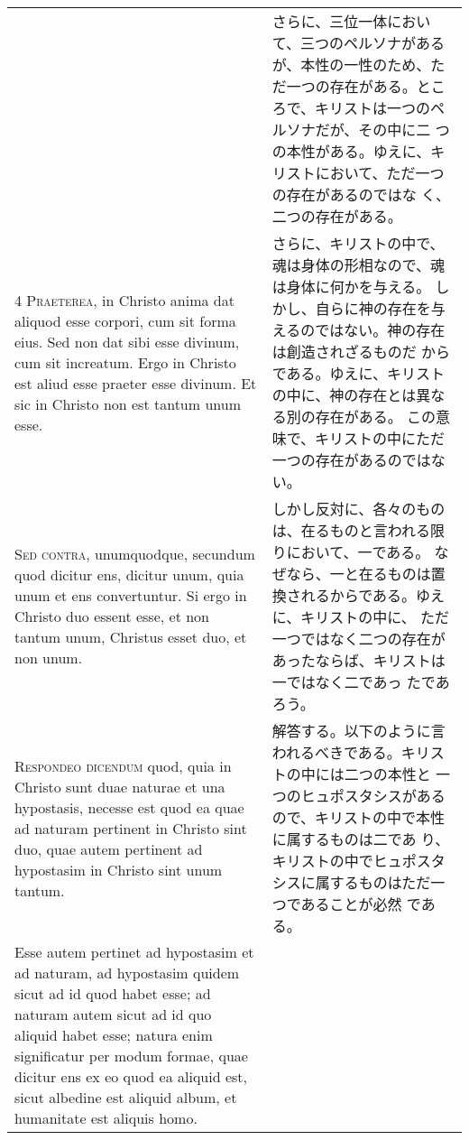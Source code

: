 \documentclass[10pt]{jsarticle} %
\begin{document}
\begin{longtable}{p{21em}p{21em}}
&

さらに、三位一体において、三つのペルソナがあるが、本性の一性のため、た
だ一つの存在がある。ところで、キリストは一つのペルソナだが、その中に二
つの本性がある。ゆえに、キリストにおいて、ただ一つの存在があるのではな
く、二つの存在がある。


\\



{\scshape 4 Praeterea}, in Christo anima dat aliquod esse corpori, cum
sit forma eius. Sed non dat sibi esse divinum, cum sit increatum. Ergo
in Christo est aliud esse praeter esse divinum. Et sic in Christo non
est tantum unum esse.


&

さらに、キリストの中で、魂は身体の形相なので、魂は身体に何かを与える。
しかし、自らに神の存在を与えるのではない。神の存在は創造されざるものだ
からである。ゆえに、キリストの中に、神の存在とは異なる別の存在がある。
この意味で、キリストの中にただ一つの存在があるのではない。


\\



{\scshape Sed contra}, unumquodque, secundum quod dicitur ens, dicitur
unum, quia unum et ens convertuntur. Si ergo in Christo duo essent
esse, et non tantum unum, Christus esset duo, et non unum.


&

しかし反対に、各々のものは、在るものと言われる限りにおいて、一である。
なぜなら、一と在るものは置換されるからである。ゆえに、キリストの中に、
ただ一つではなく二つの存在があったならば、キリストは一ではなく二であっ
たであろう。


\\



{\scshape Respondeo dicendum} quod, quia in Christo sunt duae naturae
et una hypostasis, necesse est quod ea quae ad naturam pertinent in
Christo sint duo, quae autem pertinent ad hypostasim in Christo sint
unum tantum.

&

解答する。以下のように言われるべきである。キリストの中には二つの本性と
一つのヒュポスタシスがあるので、キリストの中で本性に属するものは二であ
り、キリストの中でヒュポスタシスに属するものはただ一つであることが必然
である。


\\

Esse autem pertinet ad hypostasim et ad naturam, ad hypostasim quidem
sicut ad id quod habet esse; ad naturam autem sicut ad id quo aliquid
habet esse; natura enim significatur per modum formae, quae dicitur
ens ex eo quod ea aliquid est, sicut albedine est aliquid album, et
humanitate est aliquis homo.


\end{longtable}
\end{document}
